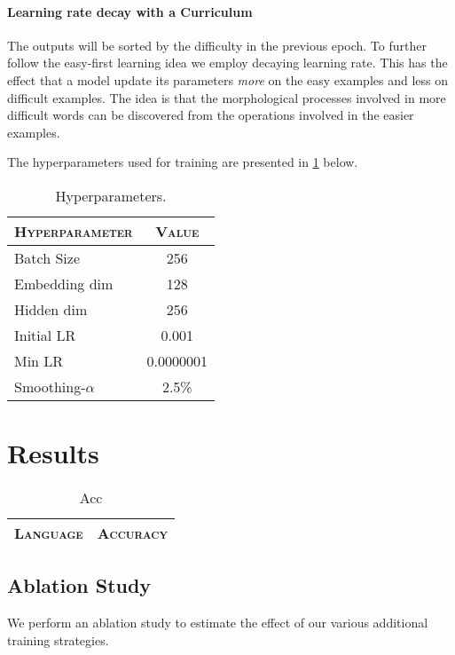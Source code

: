 \documentclass[11pt,a4paper]{article}
\begin{document}
\paragraph{Learning rate decay with a Curriculum} The outputs will be
sorted by the difficulty in the previous epoch. To further follow the
easy-first learning idea we employ decaying learning rate. This has
the effect that a model update its parameters \textit{more} on the
easy examples and less on difficult examples. The idea is that the
morphological processes involved in more difficult words can be
discovered from the operations involved in the easier examples.

The hyperparameters used for training are presented in \cref{tab:hp} below.
\begin{table}[h]	
\centering
\begin{tabular}{lc}
\textsc{Hyperparameter} & \textsc{Value} \\
  \hline
  Batch Size & 256 \\
  Embedding dim & 128 \\
  Hidden dim & 256 \\
  Initial LR & 0.001 \\
  Min LR & 0.0000001 \\
  Smoothing-$\alpha$ & 2.5\% \\
\end{tabular} 
\caption{Hyperparameters.}
\label{tab:hp}
\end{table}

\section{Results}

\begin{table}[h]	
\centering
\begin{tabular}{lc}
\textsc{Language} & \textsc{Accuracy} \\
  \hline
  
\end{tabular} 
\caption{Acc}
\label{tab:accuracy}
\end{table}



\subsection{Ablation Study}

We perform an ablation study to estimate the effect of our various
additional training strategies.
\end{document}
